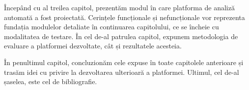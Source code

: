 \documentclass[../../main.tex]{subfiles}
\begin{document}
Începând cu al treilea capitol, prezentăm modul în care platforma de analiză automată a fost proiectată. Cerințele funcționale și nefuncționale vor reprezenta fundația modulelor detaliate în continuarea capitolului, ce se încheie cu modalitatea de testare. În cel de-al patrulea capitol, expunem metodologia de evaluare a platformei dezvoltate, cât și rezultatele acesteia.

În penultimul capitol, concluzionăm cele expuse în toate capitolele anterioare și trasăm idei cu privire la dezvoltarea ulterioară a platformei. Ultimul, cel de-al șaselea, este cel de bibliografie.
\end{document}
